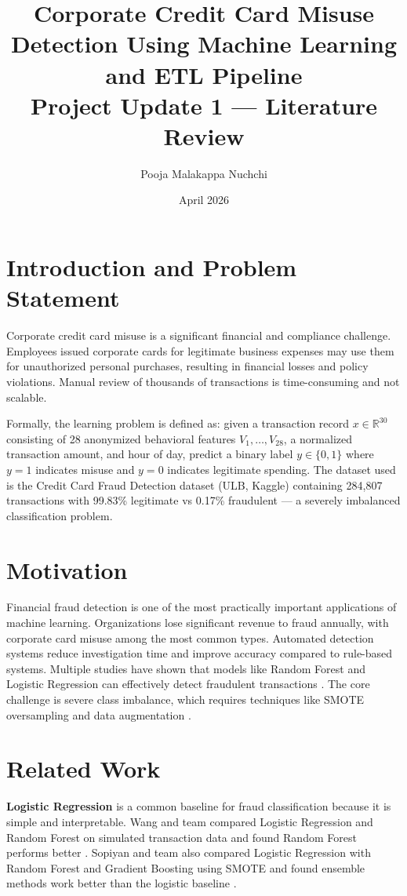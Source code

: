 \documentclass[11pt]{article}
\title{Corporate Credit Card Misuse Detection Using Machine Learning and ETL Pipeline \\ \large Project Update 1 --- Literature Review}
\author{Pooja Malakappa Nuchchi}
\date{April 2026}
\begin{document}
\maketitle

\section{Introduction and Problem Statement}

Corporate credit card misuse is a significant financial and compliance challenge. Employees issued corporate cards for legitimate business expenses may use them for unauthorized personal purchases, resulting in financial losses and policy violations. Manual review of thousands of transactions is time-consuming and not scalable.

Formally, the learning problem is defined as: given a transaction record $x \in \mathbb{R}^{30}$ consisting of 28 anonymized behavioral features $V_1, \ldots, V_{28}$, a normalized transaction amount, and hour of day, predict a binary label $y \in \{0, 1\}$ where $y = 1$ indicates misuse and $y = 0$ indicates legitimate spending. The dataset used is the Credit Card Fraud Detection dataset (ULB, Kaggle) containing 284,807 transactions with 99.83\% legitimate vs 0.17\% fraudulent --- a severely imbalanced classification problem.

\section{Motivation}

Financial fraud detection is one of the most practically important applications of machine learning. Organizations lose significant revenue to fraud annually, with corporate card misuse among the most common types. Automated detection systems reduce investigation time and improve accuracy compared to rule-based systems. Multiple studies have shown that models like Random Forest and Logistic Regression can effectively detect fraudulent transactions \cite{wang2023credit, hande2019credit}. The core challenge is severe class imbalance, which requires techniques like SMOTE oversampling and data augmentation \cite{khalid2024enhancing, strelcenia2023improving}.

\section{Related Work}

\textbf{Logistic Regression} is a common baseline for fraud classification because it is simple and interpretable. Wang and team compared Logistic Regression and Random Forest on simulated transaction data and found Random Forest performs better \cite{wang2023credit}. Sopiyan and team also compared Logistic Regression with Random Forest and Gradient Boosting using SMOTE and found ensemble methods work better than the logistic baseline \cite{sopiyan2022fraud}.
\end{document}
